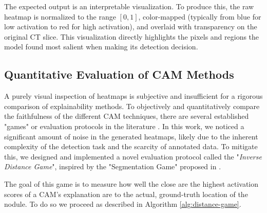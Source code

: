 The expected output is an interpretable visualization. To produce this, the raw heatmap is normalized to the range $[0, 1]$, color-mapped (typically from blue for low activation to red for high activation), and overlaid with transparency on the original CT slice. This visualization directly highlights the pixels and regions the model found most salient when making its detection decision.

\subsection{Quantitative Evaluation of CAM Methods}
\label{subsec:xai_evaluation}

A purely visual inspection of heatmaps is subjective and insufficient for a rigorous comparison of explainability methods. To objectively and quantitatively compare the faithfulness of the different CAM techniques, there are several established "games" or evaluation protocols in the literature \cite{selvaraju2019gradcam,chattopadhay_2018gradcam++,wang2020score}. In this work, we noticed a significant amount of noise in the generated heatmaps, likely due to the inherent complexity of the detection task and the scarcity of annotated data.
To mitigate this, we designed and implemented a novel evaluation protocol called the "\textit{Inverse Distance Game}", inspired by the "Segmentation Game" proposed in \cite{chattopadhay_2018gradcam++}.

The goal of this game is to measure how well the close are the highest activation scores of a CAM's explanation are to the actual, ground-truth location of the nodule. To do so we proceed as described in Algorithm \ref{alg:distance-game}.

